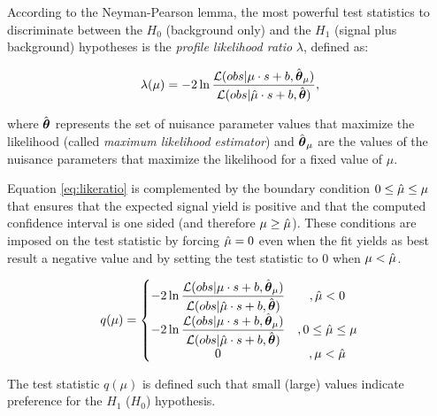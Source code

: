 
According to the Neyman-Pearson lemma, the most powerful test statistics to discriminate between the $H_0$ (background only) and the $H_1$ (signal plus background) hypotheses is the \emph{profile likelihood ratio} $\lambda$, defined as:

\begin{equation}
\label{eq:likeratio}
\lambda(\mu) = -2 \operatorname{ln} \dfrac{\mathcal{L}(obs | \mu \cdot s + b, \hat{\boldsymbol\theta}_\mu)}{\mathcal{L}(obs | \hat{\mu} \cdot s + b, \hat{\boldsymbol\theta})},
\end{equation}

where $\hat{\boldsymbol\theta}$ represents the set of nuisance parameter values that maximize the likelihood (called \emph{maximum likelihood estimator}) and $\hat{\boldsymbol\theta}_\mu$ are the values of the nuisance parameters that maximize the likelihood for a fixed value of $\mu$.

Equation \ref{eq:likeratio} is complemented by the boundary condition $0 \leq \hat{\mu} \leq \mu$ that ensures that the expected signal yield is positive and that the computed confidence interval is one sided (and therefore $\mu \geq \hat{\mu}$). These conditions are imposed on the test statistic by forcing $\hat{\mu} = 0$ even when the fit yields as best result a negative value and by setting the test statistic to 0 when $\mu < \hat{\mu}$.

\begin{equation}
q(\mu) = \left\{\begin{matrix}
-2 \operatorname{ln} \dfrac{\mathcal{L}(obs | \mu \cdot s + b, \hat{\boldsymbol\theta}_\mu)}{\mathcal{L}(obs | \hat{\mu} \cdot s + b, \hat{\boldsymbol\theta})} & , \hat{\mu} < 0\\ 
-2 \operatorname{ln} \dfrac{\mathcal{L}(obs | \mu \cdot s + b, \hat{\boldsymbol\theta}_\mu)}{\mathcal{L}(obs | \hat{\mu} \cdot s + b, \hat{\boldsymbol\theta})} & ,0 \leq \hat{\mu} \leq \mu \\ 
0 & , \mu < \hat{\mu}
\end{matrix}\right.
\label{eq:test_stat}
\end{equation}

The test statistic $q(\mu)$ is defined such that small (large) values indicate preference for the $H_1$ ($H_0$) hypothesis.

